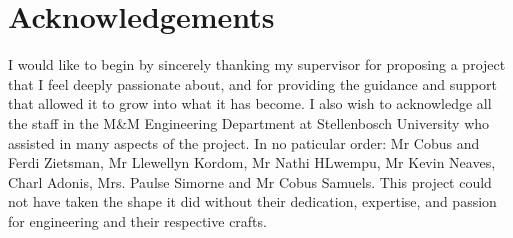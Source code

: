 \chapter*{Acknowledgements}

\begin{center} I would like to begin by sincerely thanking my supervisor for proposing a project that I feel deeply passionate about, and for providing the guidance and support that allowed it to grow into what it has become. I also wish to acknowledge all the staff in the M\&M Engineering Department at Stellenbosch University who assisted in many aspects of the project. In no paticular order: Mr Cobus and Ferdi Zietsman, Mr Llewellyn Kordom, Mr Nathi HLwempu, Mr Kevin Neaves, Charl Adonis, Mrs. Paulse Simorne and Mr Cobus Samuels. This project could not have taken the shape it did without their dedication, expertise, and passion for engineering and their respective crafts.
\end{center}


